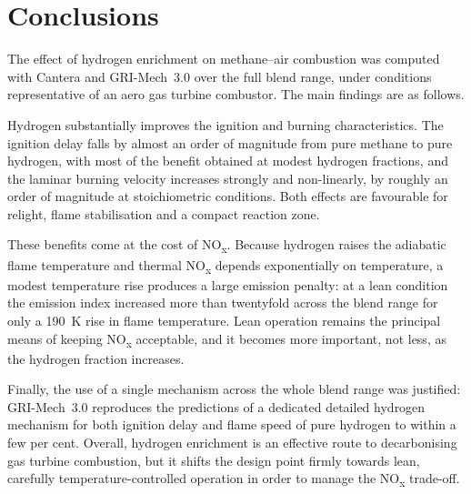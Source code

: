 \documentclass[11pt,a4paper]{article}
\begin{document}
\section{Conclusions}

The effect of hydrogen enrichment on methane--air combustion was computed with
Cantera and GRI-Mech~3.0 over the full blend range, under conditions
representative of an aero gas turbine combustor. The main findings are as
follows.

Hydrogen substantially improves the ignition and burning characteristics. The
ignition delay falls by almost an order of magnitude from pure methane to pure
hydrogen, with most of the benefit obtained at modest hydrogen fractions, and
the laminar burning velocity increases strongly and non-linearly, by roughly an
order of magnitude at stoichiometric conditions. Both effects are favourable
for relight, flame stabilisation and a compact reaction zone.

These benefits come at the cost of NO\textsubscript{x}. Because hydrogen raises
the adiabatic flame temperature and thermal NO\textsubscript{x} depends
exponentially on temperature, a modest temperature rise produces a large
emission penalty: at a lean condition the emission index increased more than
twentyfold across the blend range for only a \SI{190}{\kelvin} rise in flame
temperature. Lean operation remains the principal means of keeping
NO\textsubscript{x} acceptable, and it becomes more important, not less, as the
hydrogen fraction increases.

Finally, the use of a single mechanism across the whole blend range was
justified: GRI-Mech~3.0 reproduces the predictions of a dedicated detailed
hydrogen mechanism for both ignition delay and flame speed of pure hydrogen to
within a few per cent. Overall, hydrogen enrichment is an effective route to
decarbonising gas turbine combustion, but it shifts the design point firmly
towards lean, carefully temperature-controlled operation in order to manage the
NO\textsubscript{x} trade-off.
\end{document}
